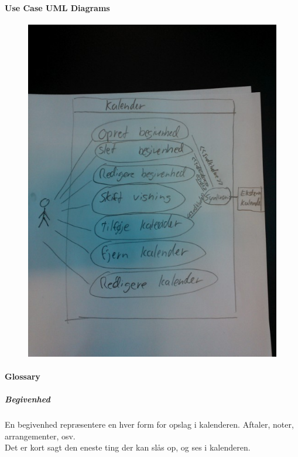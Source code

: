 \documentclass{article}
\begin{document}
   \newpage 
   \paragraph{Use Case UML Diagrams} \mbox{}

   
   \begin{figure}[h]
\caption{}   
   \centering
   \includegraphics[scale=1.5]{WP_000143.jpg}
   \end{figure}
   
   \paragraph{Glossary} \mbox{}
\subparagraph{Begivenhed} \mbox{}

En begivenhed repræsentere en hver form for opslag i kalenderen. Aftaler, noter, arrangementer, osv. \\
Det er kort sagt den eneste ting der kan slås op, og ses i kalenderen.
\end{document}
